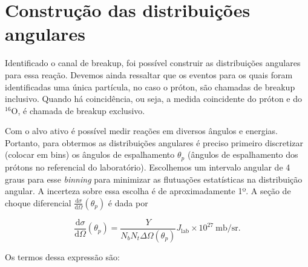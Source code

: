 \documentclass[a4paper,12pt,oneside]{book}
\begin{document}
\section{Construção das distribuições angulares}\label{sec:sec_choque}

\par Identificado o canal de breakup, foi possível construir as distribuições angulares para essa reação. Devemos ainda ressaltar que os eventos para os quais foram identificadas uma única partícula, no caso o próton, são chamadas de breakup inclusivo. Quando há coincidência, ou seja, a medida coincidente do próton e do $^{16}$O, é chamada de breakup exclusivo.


\par Com o alvo ativo é possível medir reações em diversos ângulos e energias. Portanto, para obtermos as distribuições  angulares é preciso primeiro discretizar (colocar em bins) os ângulos de espalhamento $\theta_p$ (ângulos de espalhamento dos prótons no referencial do laboratório). Escolhemos um intervalo angular de 4 graus para esse \textit{binning} para minimizar as flutuações estatísticas na distribuição angular. A incerteza sobre essa escolha é de aproximadamente 1º. A seção de choque diferencial $\frac{\mathrm{d}\sigma}{\mathrm{d}\Omega} (\theta_p)$ é dada por \cite{zamora_mater}

\begin{equation}\label{eq:cross_section}
	\frac{\mathrm{d}\sigma}{\mathrm{d}\Omega} (\theta_p) = \frac{Y}{N_bN_t\Delta\Omega(\theta_p)} J_{\mathrm{lab}} \times 10^{27} \:  \mathrm{mb/sr}.
\end{equation}

\par Os termos dessa expressão são:
\end{document}
